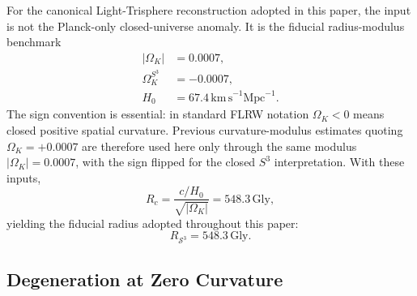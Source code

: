 \documentclass[aps,prd,onecolumn,superscriptaddress,longbibliography,nofootinbib,notitlepage]{revtex4-2}
\newcommand{\Gly}{\,\mathrm{Gly}}
\begin{document}
For the canonical Light-Trisphere reconstruction adopted in this paper, the
input is not the Planck-only closed-universe anomaly. It is the fiducial
radius-modulus benchmark
\begin{equation}
\begin{aligned}
  |\Omega_K| &= 0.0007, \\
  \Omega_K^{S^3} &= -0.0007, \\
  H_0 &= 67.4\,\mathrm{km\,s}^{-1}\mathrm{Mpc}^{-1}.
\end{aligned}
\label{eq:canonical_inputs}
\end{equation}
The sign convention is essential: in standard FLRW notation $\Omega_K<0$ means
closed positive spatial curvature. Previous curvature-modulus estimates quoting
$\Omega_K=+0.0007$ are therefore used here only through the same modulus
$|\Omega_K|=0.0007$, with the sign flipped for the closed $S^3$ interpretation.
With these inputs,
\begin{equation}
  R_c = \frac{c/H_0}{\sqrt{|\Omega_K|}}
      = 548.3\Gly,
\end{equation}
yielding the fiducial radius adopted throughout this paper:
\begin{equation}
  \boxed{R_{\mathcal{S}^3} = 548.3\Gly.}
\end{equation}

\subsection{Degeneration at Zero Curvature}
\end{document}
